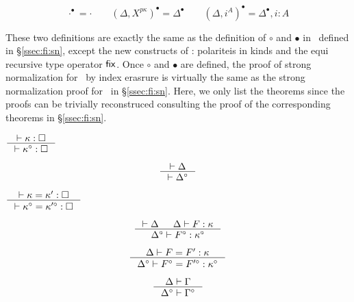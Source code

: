 \begin{definition}
\[ \cdot^\bullet = \cdot \qquad
        (\Delta,X^{p\kappa})^\bullet = \Delta^\bullet \qquad
        (\Delta,i^A)^\bullet = \Delta^\bullet,i:A
\]
\end{definition}
These two definitions are exactly the same as the definition of
$\circ$ and $\bullet$ in \Fi\ defined in \S\ref{ssec:fi:sn},
except the new constructs of \Fixi: polariteis in kinds and
the equi recursive type operator $\mathsf{fix}$.
Once $\circ$ and $\bullet$ are defined, the proof of strong normalization
for \Fixi\ by index erasrure is virtually the same as the strong normalization
proof for \Fi\ in \S\ref{ssec:fi:sn}. Here, we only list the theorems
since the proofs can be trivially reconstruced consulting the proof
of the corresponding theorems in \S\ref{ssec:fi:sn}.

\begin{theorem}
\label{thm:Fixierasesorting}
        $\inference{|- \kappa : \square}{|- \kappa^\circ : \square}$
\end{theorem}

\begin{theorem}
\label{thm:Fixierasetyctx}
\[ \inference{|- \Delta}{|- \Delta^\circ} \]
\end{theorem}

\begin{theorem}\label{thm:Fixierasekindeq}
$ \inference{|- \kappa=\kappa':\square}
        {|- \kappa^\circ=\kappa'^\circ:\square}
$
\end{theorem}

\begin{theorem}
\label{thm:Fixierasekinding}
\[ \inference{|- \Delta & \Delta |- F : \kappa}
                {\Delta^\circ |- F^\circ : \kappa^\circ}
\]
\end{theorem}
\begin{theorem}
\[ \inference{\Delta |- F=F':\kappa}
                {\Delta^\circ |- F^\circ=F'^\circ:\kappa^\circ}
\]
\label{thm:Fixierasetyconeq}
\end{theorem}

\begin{theorem}
\label{thm:Fixierasetmctx}
\[ \inference{\Delta |- \Gamma}{\Delta^\circ |- \Gamma^\circ} \]
\end{theorem}

